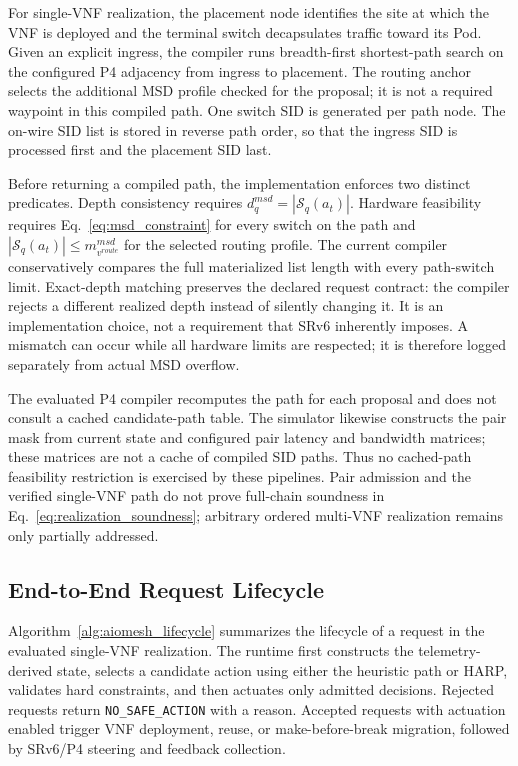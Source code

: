 \documentclass[final,5p]{elsarticle}
\newcommand{\rev}[1]{\textcolor{revisiongreen}{#1}}
\let\newrev\rev
\begin{document}
\newrev{For single-VNF realization, the placement node identifies the site at which the VNF is deployed and the terminal switch decapsulates traffic toward its Pod. Given an explicit ingress, the compiler runs breadth-first shortest-path search on the configured P4 adjacency from ingress to placement. The routing anchor selects the additional MSD profile checked for the proposal; it is not a required waypoint in this compiled path. One switch SID is generated per path node. The on-wire SID list is stored in reverse path order, so that the ingress SID is processed first and the placement SID last.}

\newrev{Before returning a compiled path, the implementation enforces two distinct predicates. Depth consistency requires \(d_q^{msd}=|\mathcal S_q(a_t)|\). Hardware feasibility requires Eq.~\eqref{eq:msd_constraint} for every switch on the path and \(|\mathcal S_q(a_t)|\le m_{v^{route}}^{msd}\) for the selected routing profile. The current compiler conservatively compares the full materialized list length with every path-switch limit. Exact-depth matching preserves the declared request contract: the compiler rejects a different realized depth instead of silently changing it. It is an implementation choice, not a requirement that SRv6 inherently imposes. A mismatch can occur while all hardware limits are respected; it is therefore logged separately from actual MSD overflow.}

\newrev{The evaluated P4 compiler recomputes the path for each proposal and does not consult a cached candidate-path table. The simulator likewise constructs the pair mask from current state and configured pair latency and bandwidth matrices; these matrices are not a cache of compiled SID paths. Thus no cached-path feasibility restriction is exercised by these pipelines. Pair admission and the verified single-VNF path do not prove full-chain soundness in Eq.~\eqref{eq:realization_soundness}; arbitrary ordered multi-VNF realization remains only partially addressed.}

\subsection{End-to-End Request Lifecycle}
\label{subsec:request_lifecycle}
Algorithm~\ref{alg:aiomesh_lifecycle} summarizes the lifecycle of \newrev{a request in the evaluated single-VNF realization}. The runtime first constructs the telemetry-derived state, selects a candidate action using either the heuristic path or HARP, validates hard constraints, and then actuates only admitted decisions. Rejected requests return \texttt{NO\_SAFE\_ACTION} with a reason. Accepted requests \newrev{with actuation enabled} trigger VNF deployment, reuse, or make-before-break migration, followed by SRv6/P4 steering and feedback collection.
\end{document}
